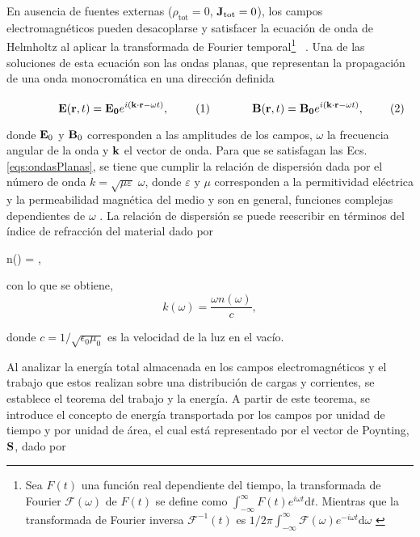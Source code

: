 En ausencia de fuentes externas (\( \rho_{\text{tot}} = 0 \), \( \vb{J}_{\text{tot}} = 0 \)), los campos electromagnéticos pueden desacoplarse y satisfacer la ecuación de onda de Helmholtz al aplicar la transformada de Fourier temporal\footnote{Sea $F(t)$ una función real dependiente del tiempo, la transformada de Fourier $\mathcal{F}(\omega)$ de $F(t)$ se define como $\int_{-\infty}^{\infty}F(t)e^{i\omega t} \text{d}t$. Mientras que la transformada de Fourier inversa $\mathcal{F}^{-1}(t)$ es $1/{2\pi}\int_{-\infty}^{\infty}\mathcal{F}(\omega)e^{-i\omega t} \text{d}\omega$ \cite{arfkenMathematicalMethodsPhysicists2011a} } ~\cite{jacksonClassicalElectrodynamics2021a}. Una de las soluciones de esta ecuación son las ondas planas, que representan la propagación de una onda monocromática en una dirección definida

	\begin{subequations}%
	\eqhalf{\vb{E}(\vb{r},t) =\vb{E_0}e^{i(\vb{k}\cdot\vb{r} -\omega t)},}\label{seq:E_plana}%
	\eqhalf{\vb{B}(\vb{r}, t) =\vb{B_0}e^{i(\vb{k}\cdot\vb{r} -\omega t)},}	\label{seq:B_plana}
	\label{eqs:ondasPlanas}\end{subequations}\vspace*{-1em}
		
\noindent donde $\vb{E}_0$ y $\vb{B}_0$ corresponden a las amplitudes de los campos, $\omega$ la frecuencia angular de la onda y $\vb{k}$ el vector de onda. Para que se satisfagan las Ecs. \eqref{eqs:ondasPlanas}, se tiene que cumplir la relación de dispersión dada por el número de onda $k=\sqrt{\mu\varepsilon}\;\omega$, donde $\varepsilon$ y $\mu$ corresponden a la permitividad eléctrica y la permeabilidad magnética del medio y son en general, funciones complejas dependientes de $\omega$ \cite{jacksonClassicalElectrodynamics2021a}. La relación de dispersión se puede reescribir en términos del índice de refracción del material dado por \cite{jacksonClassicalElectrodynamics2021a}
%
\begin{tcolorbox}
	n(\omega) = ,
	\label{eq:indice} 
\end{tcolorbox}
%	
\noindent con lo que se obtiene,
%
\begin{equation}
	k(\omega) =\dfrac{\omega n(\omega)}{c},
	\label{eq:numero_onda} 
\end{equation}

\noindent donde $c=1/\sqrt{\epsilon_0\mu_0}$ es la velocidad de la luz en el vacío.

Al analizar la energía total almacenada en los campos electromagnéticos y el trabajo que estos realizan sobre una distribución de cargas y corrientes, se establece el teorema del trabajo y la energía. A partir de este teorema, se introduce el concepto de energía transportada por los campos por unidad de tiempo y por unidad de área, el cual está representado por el vector de Poynting, $\vb{S}$, dado por \cite{griffithsIntroductionElectrodynamics2023b}

